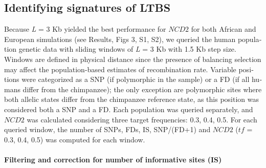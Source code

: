 \begin{refsection}
\begin{otherlanguage}{english}
\subsection{Identifying signatures of LTBS} %
Because \emph{L} = 3 Kb yielded the best performance for $NCD2$ for both African and European simulations (see Results, Figs 3, S1, S2), we queried the human population genetic data with sliding windows of \emph{L} = 3 Kb with 1.5 Kb step size. Windows are defined in physical distance since the presence of balancing selection may affect the population-based estimates of recombination rate. Variable positions were categorized as a SNP (if polymorphic in the sample) or a FD (if all humans differ from the chimpanzee); the only exception are polymorphic sites where both allelic states differ from the chimpanzee reference state, as this position was considered both a SNP and a FD. Each population was queried separately, and $NCD2$ was calculated considering three target frequencies: 0.3, 0.4, 0.5. For each queried window, the number of SNPs, FDs, IS, SNP/(FD+1) and $NCD2$ ($tf$ = 0.3, 0.4, 0.5) was computed for each window. 
\paragraph{Filtering and correction for number of informative sites (IS)}


\end{otherlanguage}
\end{refsection}
